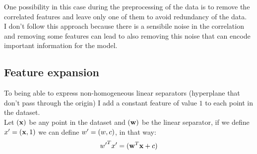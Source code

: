 One possibility in this case during the preprocessing of the data is to remove the correlated features and leave only one of them to avoid redundancy of the data.\\
I don't follow this approach because there is a sensibile noise in the correlation and removing some features can lead to also removing this noise that can encode important information for the model.\\


\subsection{Feature expansion}
To being able to express non-homogeneous linear separators (hyperplane that don't pass through the origin) I add a constant feature of value $1$ to each point in the dataset.\\
Let $\bf(x)$ be any point in the dataset and $\bf(w)$ be the linear separator, if we define $x' = ({\bf x}, 1)$ we can define $w' = ({\bf} w, c)$, in that way: $${w'}^T x' = ({\bf w}^T {\bf x} + c)$$\\
